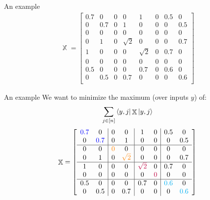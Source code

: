 \documentclass[12pt]{beamer}
\DeclareMathOperator{\X}{\mathbb{X}}		     %
\begin{document}
\begin{frame}{An example}
    \begin{align}
    \X = \left[ \begin{array}{cc|cc|cc|cc}
    0.7 & 0 & 0 & 0 & 1 & 0 & 0.5 & 0\\
    0 & 0.7 & 0 & 1 & 0 & 0 & 0 & 0.5\\
    \hline
    0 & 0 & 0 & 0 & 0 & 0 & 0 & 0\\
    0 & 1 & 0 & \sqrt{2} & 0 & 0 & 0 & 0.7\\
    \hline
    1 & 0 & 0 & 0 & \sqrt{2} & 0 & 0.7 & 0\\
    0 & 0 & 0 & 0 & 0 & 0 & 0 & 0\\
    \hline
    0.5 & 0 & 0 & 0 & 0.7 & 0 & 0.6 & 0\\
    0 & 0.5 & 0 & 0.7 & 0 & 0 & 0 & 0.6\\
    \end{array}
\right] \nonumber
\end{align}
\end{frame}

\begin{frame}{An example}
    We want to minimize the maximum (over inputs $y$) of:
    \begin{align}
         \sum_{j \in [n]}
    \bra{y,j}\X\ket{y,j}   \nonumber
    \end{align}
    \begin{align}
    \X = \left[ \begin{array}{cc|cc|cc|cc}
    \color{blue}0.7 & 0 & 0 & 0 & 1 & 0 & 0.5 & 0\\
    0 & \color{blue}0.7 & 0 & 1 & 0 & 0 & 0 & 0.5\\
    \hline
    0 & 0 & \color{orange}0 & 0 & 0 & 0 & 0 & 0\\
    0 & 1 & 0 & \color{orange}\sqrt{2} & 0 & 0 & 0 & 0.7\\
    \hline
    1 & 0 & 0 & 0 & \color{purple}\sqrt{2} & 0 & 0.7 & 0\\
    0 & 0 & 0 & 0 & 0 & \color{purple}0 & 0 & 0\\
    \hline
    0.5 & 0 & 0 & 0 & 0.7 & 0 & \color{cyan}0.6 & 0\\
    0 & 0.5 & 0 & 0.7 & 0 & 0 & 0 & \color{cyan}0.6\\
    \end{array}
\right] \nonumber
\end{align}
\end{frame}
\end{document}
